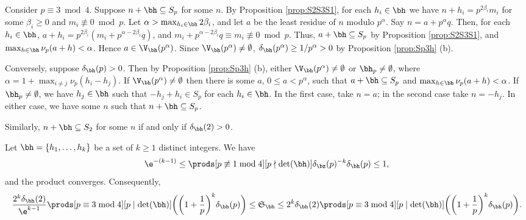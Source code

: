 \documentclass[12pt, reqno, twoside, letterpaper]{amsart}
\begin{document}
%
\begin{nixnix}
%
Consider $p \equiv 3 \bmod 4$.
%
Suppose $n + \bh \subseteq S_p$ for some $n$.
%
By Proposition \ref{prop:S2S3S1}, for each $h_i \in \bh$ we have 
$n + h_i = p^{2\beta_i}m_i$ for some $\beta_i \ge 0$ and 
$m_i \not\equiv 0 \bmod p$.
%
Let $\alpha > \max_{h_i \in \bh} 2\beta_i$, and let $a$ be the 
least residue of $n$ modulo $p^{\alpha}$. 
%
Say $n = a + p^{\alpha}q$.
%
Then, for each $h_i \in \bh$, 
$
 a + h_i 
  = p^{2\beta_i}(m_i + p^{\alpha - 2\beta_i}q)
$, 
and 
$
 m_i + p^{\alpha - 2\beta_i}q \equiv m_i \not\equiv 0 \bmod p
$.
%
Thus, $a + \bh \subseteq S_p$ by Proposition \ref{prop:S2S3S1}, 
and $\max_{h \in \bh} \nu_p(a + h) < \alpha$.
%
Hence $a \in \V_{\bh}(p^{\alpha})$. 
%
Since $\V_{\bh}(p^{\alpha}) \ne \emptyset$, 
$\delta_{\bh}(p^{\alpha}) \ge 1/p^{\alpha} > 0$ by 
Proposition \ref{prop:Sp3h} (b).

Conversely, suppose $\delta_{\bh}(p) > 0$.
%
Then by Proposition \ref{prop:Sp3h} (b), either 
$\V_{\bh}(p^{\alpha}) \ne \emptyset$ or $\bh_p \ne \emptyset$, 
where $\alpha = 1 + \max_{i \ne j} \nu_p(h_i - h_j)$.
%
If $\V_{\bh}(p^{\alpha}) \ne \emptyset$ then there is some $a$, 
$0 \le a < p^{\alpha}$, such that $a + \bh \subseteq S_p$ and 
$\max_{h \in \bh} \nu_p(a + h) < \alpha$.
%
If $\bh_p \ne \emptyset$, we have $h_j \in \bh$ such that 
$-h_j + h_i \in S_p$ for each $h_i \in \bh$.
%
In the first case, take $n = a$; in the second case take 
$n = -h_j$.
%
In either case, we have some $n$ such that 
$n + \bh \subseteq S_p$.

Similarly, $n + \bh \subseteq S_2$ for some $n$ if and only if 
$\delta_{\bh}(2) > 0$.
\end{nixnix}
%

\begin{proposition}
 \label{prop:sssc}
%
Let $\bh = \{h_1,\ldots,h_k\}$ be a set of $k \ge 1$ distinct 
integers.
%
We have 
\begin{equation}
 \label{eq:sssc1}
 \e^{-(k - 1)}
  \le 
   \prods[p \not\equiv 1 \bmod 4][p \nmid \det(\bh)] 
    \delta_{\bz}(p)^{-k}\delta_{\bh}(p)
     \le 
      1,
\end{equation}
and the product converges.
%
Consequently, 
{\small 
\begin{equation}
 \label{eq:sssc2}
  \frac{2^{k} \delta_{\bh}(2) }{\e^{k - 1} }
   \prods[p \equiv 3 \bmod 4][p \mid \det(\bh)]
    \bigg(   
     \bigg( 1 + \frac{1}{p} \bigg)^k 
      \delta_{\bh}(p) 
    \bigg)
  \le 
   \mathfrak{S}_{\bh}
    \le 
     2^k\delta_{\bh}(2)
      \prods[p \equiv 3 \bmod 4][p \mid \det(\bh)]
       \bigg(    
        \bigg( 1 + \frac{1}{p} \bigg)^k
         \delta_{\bh}(p) 
       \bigg).
\end{equation}
}
\end{proposition}
\end{document}
